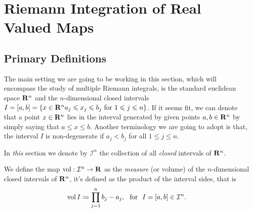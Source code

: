 \section{Riemann Integration of Real Valued Maps}

\subsection{Primary Definitions}

The main setting we are going to be working in this section, which will
encompass the study of multiple Riemann integrals, is the standard euclidean
space \(\mathbf{R}^n\) and the \(n\)-dimensional closed intervals \(I = [a, b] = \{x \in
\mathbf{R}^n \relax a_j \leqslant x_j \leqslant b_j \text{ for } 1 \leqslant j \leqslant n\}\). If it seems fit,
we can denote that a point \(x \in \mathbf{R}^n\) lies in the interval generated by
given points \(a, b \in \mathbf{R}^n\) by simply saying that \(a \leq x \leq
b\). Another terminology we are going to adopt is that, the interval \(I\) is
non-degenerate if \(a_j < b_j\) for all \(1 \leq j \leq n\).

\begin{notation}
    In \emph{this} section we denote by \(\mathcal I^n\) the collection of all
    \emph{closed} intervals of \(\mathbf{R}^n\).
\end{notation}

\begin{definition}
    \label{def:interval-measure}
    We define the map \(\operatorname{vol}: \mathcal I^n \to \mathbf{R}\) as the \emph{measure} (or
    volume) of the \(n\)-dimensional closed intervals of \(\mathbf{R}^n\), it's defined as
    the product of the interval sides, that is
    \[
        \operatorname{vol} I \coloneq \prod_{j=1}^n b_j - a_j,
        \ \text{ for }\ I = [a, b] \in \mathcal I^n.
    \]
\end{definition}

